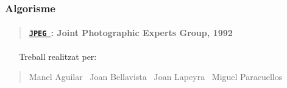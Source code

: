 \subsubsection*{Algorisme}

\begin{quote}
\paragraph*{\href{./classdomini_1_1algorithm_1_1JPEG.html}{\tt J\+P\+EG }\+: Joint Photographic Experts Group, 1992}

\end{quote}
~\newline
 ~\newline
 Treball realitzat per\+: \begin{quote}
Manel Aguilar~\newline
 Joan Bellavista~\newline
 Joan Lapeyra~\newline
 Miguel Paracuellos~\newline
\end{quote}

